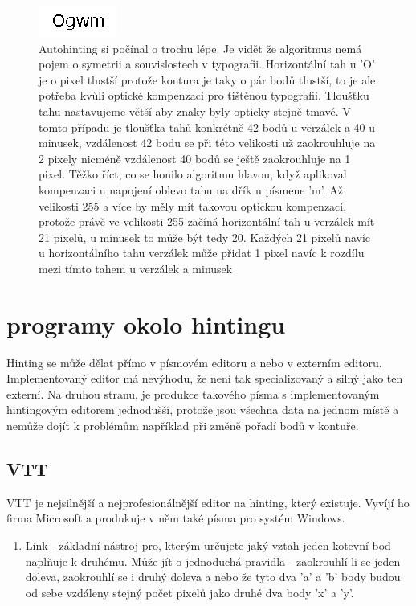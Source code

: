 \documentclass[a4paper]{article}
\begin{document}
\begin{enumerate}
\begin{figure}[H]
  \includegraphics[width=\linewidth]{pics/autohinting.png}
  \caption{Autohinting si počínal o trochu lépe. Je vidět že algoritmus nemá pojem o symetrii a souvislostech v typografii. Horizontální tah u 'O' je o pixel tlustší protože kontura je taky o pár bodů tlustší, to je ale potřeba kvůli optické kompenzaci pro tištěnou typografii. Tloušťku tahu nastavujeme větší aby znaky byly opticky stejně tmavé. V tomto případu je tloušťka tahů konkrétně 42 bodů u verzálek a 40 u minusek, vzdálenost 42 bodu se při této velikosti už zaokrouhluje na 2 pixely nicméně vzdálenost 40 bodů se ještě zaokrouhluje na 1 pixel. Těžko říct, co se honilo algoritmu hlavou, když aplikoval kompenzaci u napojení oblevo tahu na dřík u písmene 'm'. Až velikosti 255 a více by měly mít takovou optickou kompenzaci, protože právě ve velikosti 255 začíná horizontální tah u verzálek mít 21 pixelů, u mínusek to může být tedy 20. Každých 21 pixelů navíc u horizontálního tahu verzálek může přidat 1 pixel navíc k rozdílu mezi tímto tahem u verzálek a minusek }
\end{figure}

\section{programy okolo hintingu}
Hinting se může dělat přímo v písmovém editoru a nebo v externím editoru. Implementovaný editor má nevýhodu, že není tak specializovaný a silný jako ten externí. Na druhou stranu, je produkce takového písma s implementovaným hintingovým editorem jednodušší, protože jsou všechna data na jednom místě a nemůže dojít k problémům například při změně pořadí bodů v kontuře.

\subsection{VTT}
VTT je nejsilnější a nejprofesionálnější editor na hinting, který existuje. Vyvíjí ho firma Microsoft a produkuje v něm také písma pro systém Windows.
\begin{enumerate}
\item Link - základní nástroj pro, kterým určujete jaký vztah jeden kotevní bod naplňuje k druhému. Může jít o jednoduchá pravidla - zaokrouhlí-li se jeden doleva, zaokrouhlí se i druhý doleva a nebo že tyto dva 'a' a 'b' body budou od sebe vzdáleny stejný počet pixelů jako druhé dva body 'x' a 'y'.


\end{enumerate}
\end{enumerate}
\end{document}

